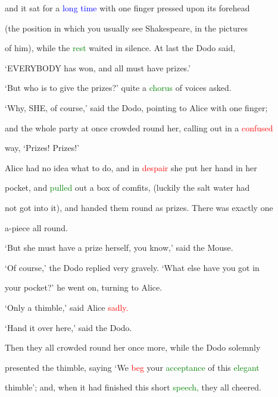  and it sat for a \textcolor{blue}{long} \textcolor{blue}{time} with one finger pressed upon its forehead

 (the position in which you usually see Shakespeare, in the pictures

 of him), while the \textcolor{green}{rest} \textcolor{BurntOrange}{waited} in silence. At last the Dodo said,

 ‘EVERYBODY has won, and all must have prizes.’



 ‘But who is to give the prizes?’ quite a \textcolor{green}{chorus} of voices asked.



 ‘Why, SHE, of course,’ said the Dodo, pointing to Alice with one finger;

 and the whole party at once crowded round her, calling out in a \textcolor{red}{confused}

 way, ‘Prizes! Prizes!’



 Alice had no idea what to do, and in \textcolor{red}{despair} she put her hand in her

 pocket, and \textcolor{green}{pulled} out a box of comfits, (luckily the salt water had

 not got into it), and handed them round as prizes. There was exactly one

 a-piece all round.



 ‘But she must have a prize herself, you know,’ said the Mouse.



 ‘Of course,’ the Dodo replied very gravely. ‘What else have you got in

 your pocket?’ he went on, turning to Alice.



 ‘Only a thimble,’ said Alice \textcolor{red}{sadly.}



 ‘Hand it over here,’ said the Dodo.



 Then they all crowded round her once more, while the Dodo solemnly

 \textcolor{BurntOrange}{presented} the thimble, saying ‘We \textcolor{red}{beg} your \textcolor{green}{acceptance} of this \textcolor{green}{elegant}

 thimble’; and, when it had finished this short \textcolor{green}{speech,} they all \textcolor{BurntOrange}{cheered.}



